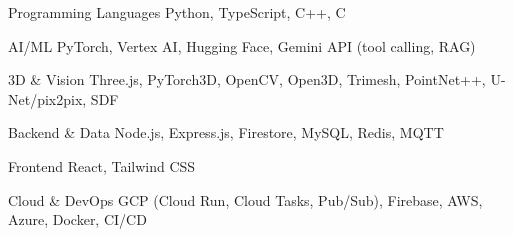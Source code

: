 

\begin{cvskills}

  \cvskill
    {Programming Languages}
    {Python, TypeScript, C++, C}

  \cvskill
    {AI/ML}
    {PyTorch, Vertex AI, Hugging Face, Gemini API (tool calling, RAG)}

  \cvskill
    {3D \& Vision}
    {Three.js, PyTorch3D, OpenCV, Open3D, Trimesh, PointNet++, U-Net/pix2pix, SDF}

  \cvskill
    {Backend \& Data}
    {Node.js, Express.js, Firestore, MySQL, Redis, MQTT}

  \cvskill
    {Frontend}
    {React, Tailwind CSS}

  \cvskill
    {Cloud \& DevOps}
    {GCP (Cloud Run, Cloud Tasks, Pub/Sub), Firebase, AWS, Azure, Docker, CI/CD}

\end{cvskills}


